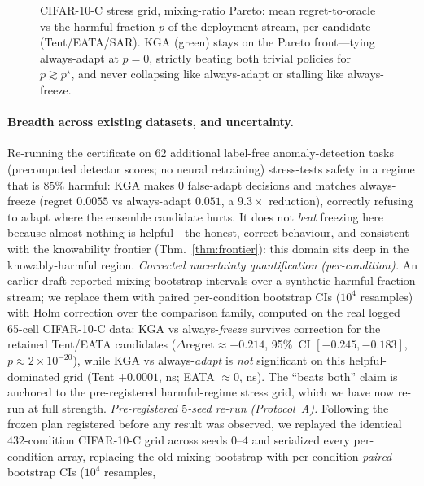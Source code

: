 \documentclass[conference]{IEEEtran}
\theoremstyle{plain}
\theoremstyle{definition}
\begin{document}
\begin{figure}[tb]\centering
{}
\caption{CIFAR-10-C stress grid, mixing-ratio Pareto: mean regret-to-oracle vs the harmful
fraction $p$ of the deployment stream, per candidate (Tent/EATA/SAR). \textsc{KGA} (green)
stays on the Pareto front---tying always-adapt at $p{=}0$, strictly beating both trivial
policies for $p\gtrsim p^\star$, and never collapsing like always-adapt or stalling like
always-freeze.}
\label{fig:decisive}
\end{figure}

\paragraph{Breadth across existing datasets, and uncertainty.} Re-running the certificate on
$62$ additional label-free anomaly-detection tasks (precomputed detector scores; no neural
retraining) stress-tests safety in a regime that is $85\%$ harmful: \textsc{KGA} makes $0$
false-adapt decisions and matches always-freeze (regret $0.0055$ vs always-adapt $0.051$, a
$9.3\times$ reduction), correctly refusing to adapt where the ensemble candidate hurts. It does
not \emph{beat} freezing here because almost nothing is helpful---the honest, correct behaviour,
and consistent with the knowability frontier (Thm.~\ref{thm:frontier}): this domain sits deep in the
knowably-harmful region. \emph{Corrected uncertainty quantification (per-condition).} An
earlier draft reported mixing-bootstrap intervals over a synthetic harmful-fraction
stream; we replace them with paired per-condition bootstrap CIs ($10^4$ resamples) with
Holm correction over the comparison family, computed on the real logged 65-cell
CIFAR-10-C data: \textsc{KGA} vs always-\emph{freeze} survives correction for the retained
Tent/EATA candidates ($\Delta\mathrm{regret}\approx-0.214$, 95\%~CI $[-0.245,-0.183]$,
$p\approx2\times10^{-20}$), while \textsc{KGA} vs always-\emph{adapt} is \emph{not}
significant on this helpful-dominated grid (Tent $+0.0001$, ns; EATA $\approx0$, ns).
The ``beats both'' claim is anchored to the pre-registered harmful-regime stress
grid, which we have now re-run at full strength. \emph{Pre-registered $5$-seed
re-run (Protocol~A).} Following the frozen plan registered
before any result was observed, we replayed the identical $432$-condition CIFAR-10-C
grid across seeds $0$--$4$ and serialized every per-condition array, replacing the
old mixing bootstrap with per-condition \emph{paired} bootstrap CIs ($10^4$ resamples,
\end{document}

